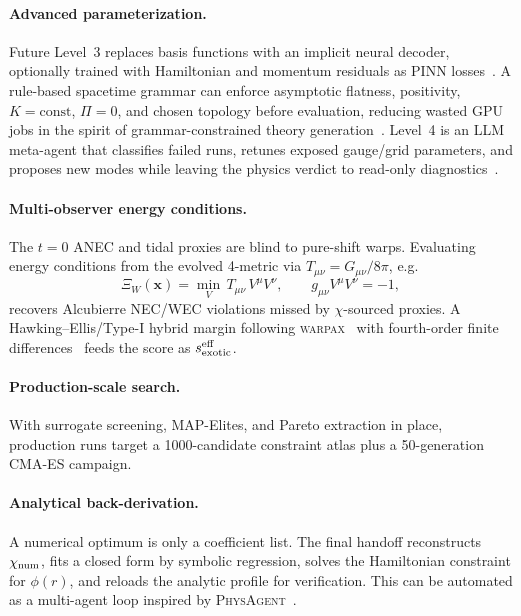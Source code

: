 \documentclass[twocolumn,floatfix,aps,prd,nofootinbib]{revtex4-2}
\begin{document}
\paragraph{Advanced parameterization.}
Future Level~3 replaces basis functions with an implicit neural decoder, optionally trained with Hamiltonian and momentum residuals as PINN losses~\cite{li2023pinn}.  A rule-based spacetime grammar can enforce asymptotic flatness, positivity, $K=\mathrm{const}$, $\Pi=0$, and chosen topology before evaluation, reducing wasted GPU jobs in the spirit of grammar-constrained theory generation~\cite{alexander2026albert}.  Level~4 is an LLM meta-agent that classifies failed runs, retunes exposed gauge/grid parameters, and proposes new modes while leaving the physics verdict to read-only diagnostics~\cite{qiu2026collideragent}.

\paragraph{Multi-observer energy conditions.}
The $t=0$ ANEC and tidal proxies are blind to pure-shift warps.  Evaluating energy conditions from the evolved 4-metric via $T_{\mu\nu}=G_{\mu\nu}/8\pi$, e.g.\
\begin{equation}
    \Xi_W(\mathbf{x}) = \min_{V}\,T_{\mu\nu}\,V^{\mu}V^{\nu},\qquad g_{\mu\nu}V^\mu V^\nu=-1,
\end{equation}
recovers Alcubierre NEC/WEC violations missed by $\chi$-sourced proxies.  A Hawking--Ellis/Type-I hybrid margin following \textsc{warpax}~\cite{le2026warpax} with fourth-order finite differences~\cite{lousto2006fourth} feeds the score as $s_{\rm exotic}^{\rm eff}$.

\paragraph{Production-scale search.}
With surrogate screening, MAP-Elites, and Pareto extraction in place, production runs target a 1000-candidate constraint atlas plus a 50-generation CMA-ES campaign.

\paragraph{Analytical back-derivation.}
A numerical optimum is only a coefficient list.  The final handoff reconstructs $\chi_{\rm num}$, fits a closed form by symbolic regression, solves the Hamiltonian constraint for $\phi(r)$, and reloads the analytic profile for verification.  This can be automated as a multi-agent loop inspired by \textsc{PhysAgent}~\cite{han2025physagent}.
\end{document}
